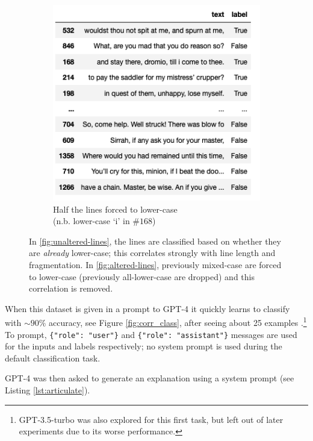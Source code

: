 \documentclass[a4paper, 11pt]{article}
\begin{document}
\begin{figure}
\begin{subfigure}{0.49\textwidth}
    \includegraphics[width=\textwidth]{images/balanced-forced-comedy-of-errors-lines.png}
    \captionsetup{justification=centering}
    \caption{Half the lines forced to lower-case\\(n.b. lower-case `i' in $\#168$)}
    \label{fig:altered-lines}
\end{subfigure}
\caption{
In \eqref{fig:unaltered-lines}, the lines are classified based on whether they are \emph{already} lower-case; this correlates strongly with line length and fragmentation.
In \eqref{fig:altered-lines}, previously mixed-case are forced to lower-case (previously all-lower-case are dropped) and this correlation is removed.
}
\end{figure}


When this dataset is given in a prompt to GPT-4 it quickly learns to classify with ${\sim}90\%$ accuracy, see Figure \ref{fig:corr_class}, after seeing about 25 examples .\footnote{
GPT-3.5-turbo was also explored for this first task, but left out of later experiments due to its worse performance.}
To prompt, \texttt{\{"role": "user"\}} and \texttt{\{"role": "assistant"\}} messages are used for the inputs and labels respectively; no system prompt is used during the default classification task.

GPT-4 was then asked to generate an explanation using a system prompt (see Listing \ref{lst:articulate}).
\end{document}
